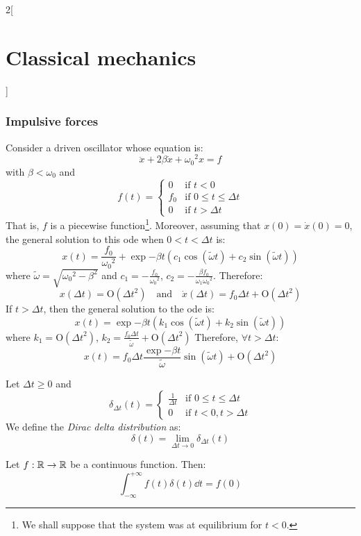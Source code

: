 \documentclass[../../../main.tex]{subfiles}
\begin{document}
\begin{multicols}{2}[\section{Classical mechanics}]
  \subsubsection{Impulsive forces}
  \begin{proposition}
    Consider a driven oscillator whose equation is:
    \begin{equation}\label{CM_impulse}
      \ddot{x}+2\beta\dot{x}+{\omega_0}^2x=f
    \end{equation}
    with $\beta<\omega_0$ and $$f(t)=
      \begin{cases}
        0   & \text{if }t<0                  \\
        f_0 & \text{if }0\leq t\leq \Delta t \\
        0   & \text{if }t>\Delta t
      \end{cases}$$
    That is, $f$ is a piecewise function\footnote{We shall suppose that the system was at equilibrium for $t<0$.}. Moreover, assuming that $x(0)=\dot{x}(0)=0$, the general solution to this ode when $0<t<\Delta t$ is:
    $$x(t)=\frac{f_0}{{\omega_0}^2}+\exp{-\beta t}\left(c_1\cos(\tilde{\omega}t)+c_2\sin(\tilde{\omega}t)\right)$$
    where $\tilde{\omega}=\sqrt{{\omega_0}^2-\beta^2}$ and $c_1=-\frac{f_0}{{\omega_0}^2}$, $c_2=-\frac{\beta f_0}{\omega_1{\omega_0}^2}$.
    Therefore: $$x(\Delta t)=\text{O}({\Delta t}^2)\quad\text{and}\quad\dot{x}(\Delta t)=f_0\Delta t+\text{O}({\Delta t}^2)$$
    If $t>\Delta t$, then the general solution to the ode is:
    $$x(t)=\exp{-\beta t}\left(k_1\cos(\tilde{\omega}t)+k_2\sin(\tilde{\omega}t)\right)$$ where $k_1=\text{O}({\Delta t}^2)$, $k_2=\frac{f_0\Delta t}{\tilde{\omega}}+\text{O}({\Delta t}^2)$
    Therefore, $\forall t>\Delta t$: $$x(t)=f_0\Delta t\frac{\exp{-\beta t}}{\tilde{\omega}}\sin(\tilde{\omega}t)+\text{O}({\Delta t}^2)$$
  \end{proposition}
  \begin{definition}
    Let $\Delta t\geq 0$ and $$\delta_{\Delta t}(t)=
      \begin{cases}
        \frac{1}{\Delta t} & \text{if }0\leq t\leq \Delta t \\
        0                  & \text{if }t<0,t>\Delta t
      \end{cases}
    $$
    We define the \emph{Dirac delta distribution} as: $$\delta(t)=\lim_{\Delta t\to 0}\delta_{\Delta t}(t)$$
  \end{definition}
  \begin{proposition}
    Let $f:\mathbb{R}\rightarrow\mathbb{R}$ be a continuous function. Then: $$\int_{-\infty}^{+\infty}f(t)\delta(t)\dd{t}=f(0)$$

\end{proposition}
\end{multicols}
\end{document}
